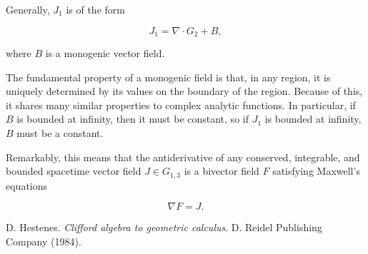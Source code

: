 \documentclass{article}
\begin{document}
  Generally, $J_1$ is of the form

  \begin{equation}
    J_1 = \nabla \cdot G_2 + B,
  \end{equation}

  where $B$ is a monogenic vector field. 

  The fundamental property of a monogenic field is that, in any region, it is uniquely determined by its values on the boundary of the region. Because of this, it shares many similar properties to complex analytic functions. In particular, if $B$ is bounded at infinity, then it must be constant, so if $J_1$ is bounded at infinity, $B$ must be a constant.

  Remarkably, this means that the antiderivative of any conserved, integrable, and bounded spacetime vector field $J \in G_{1,3}$ is a bivector field $F$ satisfying Maxwell's equations

  \begin{equation}
    \nabla F = J.\label{eq:maxwell}
  \end{equation}

  \begin{thebibliography}{9} 

      D. Hestenes.
      \emph{Clifford algebra to geometric calculus}.
      D. Reidel Publishing Company (1984).

  \end{thebibliography}
\end{document}
